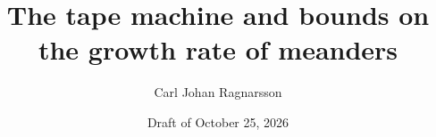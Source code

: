 \documentclass[11pt]{article}
\begin{document}
\title{The tape machine and bounds on the growth rate of meanders}
\author{Carl Johan Ragnarsson}
\date{Draft of October 25, 2026}
\maketitle











\clearpage
\appendix




\end{document}
